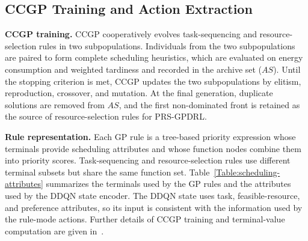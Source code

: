\documentclass[10pt,journal]{IEEEtran}
\begin{document}
\subsection{CCGP Training and Action Extraction}
\label{Sec: CCGP action extraction}

\textbf{CCGP training.} CCGP cooperatively evolves task-sequencing and resource-selection rules in two subpopulations. Individuals from the two subpopulations are paired to form complete scheduling heuristics, which are evaluated on energy consumption and weighted tardiness and recorded in the archive set ($AS$). Until the stopping criterion is met, CCGP updates the two subpopulations by elitism, reproduction, crossover, and mutation. At the final generation, duplicate solutions are removed from $AS$, and the first non-dominated front is retained as the source of resource-selection rules for PRS-GPDRL.

\textbf{Rule representation.} Each GP rule is a tree-based priority expression whose terminals provide scheduling attributes and whose function nodes combine them into priority scores. Task-sequencing and resource-selection rules use different terminal subsets but share the same function set. Table~\ref{Table:scheduling-attributes} summarizes the terminals used by the GP rules and the attributes used by the DDQN state encoder. The DDQN state uses task, feasible-resource, and preference attributes, so its input is consistent with the information used by the rule-mode actions. Further details of CCGP training and terminal-value computation are given in~\cite{ccgp}.
\end{document}
